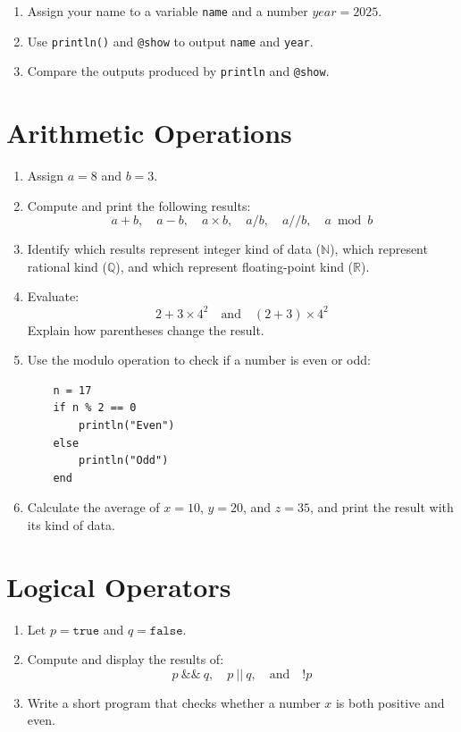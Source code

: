\documentclass{article}
\begin{document}
\begin{enumerate}
    \item Assign your name to a variable \texttt{name} and a number \(year = 2025\).
    
    \item Use \texttt{println()} and \texttt{@show} to output \texttt{name} and \texttt{year}.
    
    \item Compare the outputs produced by \texttt{println} and \texttt{@show}.
\end{enumerate}

\section*{Arithmetic Operations}

\begin{enumerate}
    \item Assign \(a = 8\) and \(b = 3\).
    
    \item Compute and print the following results:
    \[
    a + b, \quad a - b, \quad a \times b, \quad a / b, \quad a // b, \quad a \bmod b
    \]
    
    \item Identify which results represent integer kind of data ($\mathbb{N}$), which represent rational kind ($\mathbb{Q}$), and which represent floating-point kind ($\mathbb{R}$).
    
    \item Evaluate:
    \[
    2 + 3 \times 4^2 \quad \text{and} \quad (2 + 3) \times 4^2
    \]
    Explain how parentheses change the result.
    
    \item Use the modulo operation to check if a number is even or odd:
    \begin{verbatim}
    n = 17
    if n % 2 == 0
        println("Even")
    else
        println("Odd")
    end
    \end{verbatim}
    
    \item Calculate the average of \(x = 10\), \(y = 20\), and \(z = 35\), and print the result with its kind of data.
\end{enumerate}

\section*{Logical Operators}

\begin{enumerate}
    \item Let \(p = \texttt{true}\) and \(q = \texttt{false}\).
    
    \item Compute and display the results of:
    \[
    p \ \&\&\ q, \quad p \ || \ q, \quad \text{and} \quad !p
    \]
    
    \item Write a short program that checks whether a number \(x\) is both positive and even.
\end{enumerate}
\end{document}
